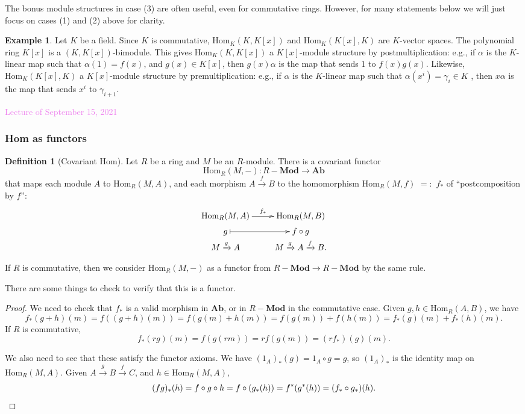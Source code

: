 \documentclass{amsart}[12pt]
\newcommand{\Hom}{\mathrm{Hom}}
\newcommand{\Sept}[1]{\textcolor{violet}{Lecture of September #1, 2021}}
\newcommand{\Def}[1]{#1 \index{#1}}
\numberwithin{equation}{section}
\theoremstyle{plain} %
\theoremstyle{definition}
\newtheorem{defn}[equation]{Definition}
\newtheorem{ex}[equation]{Example}
\theoremstyle{remark}
\newcommand{\sssec}[1]{\subsubsection{#1}}
\newcommand{\xra}[1]{\xrightarrow{#1}}
\newcommand{\Ab}{\mathbf{Ab}}
\newcommand{\Mod}[1]{#1-\mathbf{Mod}}
\begin{document}
 

The bonus module structures in case (3) are often useful, even for commutative rings. However, for many statements below we will just focus on cases (1) and (2) above for clarity.

\begin{ex} Let $K$ be a field.
Since $K$ is commutative, $\Hom_K(K,K[x])$ and $\Hom_K(K[x],K)$ are $K$-vector spaces.
The polynomial ring $K[x]$ is a $(K,K[x])$-bimodule. This gives $\Hom_K(K,K[x])$ a $K[x]$-module structure by postmultiplication: e.g., if $\alpha$ is the $K$-linear map such that $\alpha(1)=f(x)$, and $g(x)\in K[x]$, then $g(x) \alpha$ is the map that sends $1$ to $f(x)g(x)$.
Likewise, $\Hom_K(K[x],K)$ a $K[x]$-module structure by premultiplication: e.g., if $\alpha$ is the $K$-linear map such that $\alpha(x^i)=\gamma_i\in K$ , then $x \alpha$ is the map that sends $x^i$ to $\gamma_{i+1}$.
\end{ex}



\Sept{15}

\sssec{Hom as functors}

\begin{defn}[Covariant Hom] Let $R$ be a ring and $M$ be an $R$-module. There is a covariant functor \index{$\Hom_R(M,-)$}
\[ \Hom_R(M,-) : \Mod{R} \to \Ab\]
that maps each module $A$ to  $\Hom_R(M,A)$, and each morphism $A\xra{f} B$ to the homomorphism {\Def{$\Hom_{R}(M,f)$}  $=:$ \Def{$f_*$}} of ``postcomposition by $f$'':
		$$\xymatrix@R=1mm{\Hom_{R}(M,A) \ar[r]^{f_*} & \Hom_{R}(M,B) \\g \ar@{|->}[r] & f\circ g
		\\ M \xrightarrow{g}A & M \xrightarrow{g} A \xrightarrow{f} B.  }$$
		
If $R$ is commutative, then we consider $\Hom_R(M,-)$ as a functor from $ \Mod{R} \to \Mod{R}$ by the same rule.
\end{defn}
There are some things to check to verify that this is a functor.
\begin{proof}
We need to check that $f_*$ is a valid morphism in $\Ab$, or in $\Mod{R}$ in the commutative case.
Given $g,h\in \Hom_{R}(A,B)$, we have \[f_*(g+h)(m)=f((g+h)(m))=f(g(m)+h(m))=f(g(m))+f(h(m)) = f_*(g)(m) + f_*(h)(m).\]
If $R$ is commutative,
\[ f_*(rg)(m) = f(g(rm)) = r f(g(m)) = (r f_*)(g)(m).\]

We also need to see that these satisfy the functor axioms. We have $(1_A)_*(g) = 1_A \circ g = g$, so $(1_A)_*$ is the identity map on $\Hom_R(M,A)$. Given $A\xra{g}B\xra{f} C$, and $h\in \Hom_R(M,A)$, \[(fg)_* (h) = f\circ g \circ h = f \circ (g_*(h))= f^*(g^*(h)) = (f_* \circ g_*)(h).\qedhere\]
\end{proof}
\end{document}
